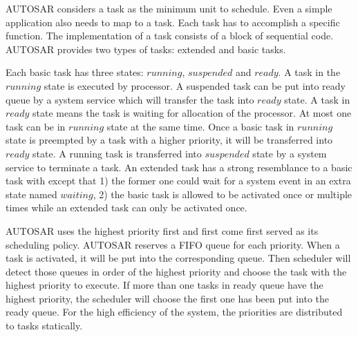 \documentclass[sigconf]{acmart}
\begin{document}
AUTOSAR considers a task as the minimum unit to schedule. Even a simple application also needs to map to a task. Each task has to accomplish a specific function. The implementation of a task consists of a block of sequential code. AUTOSAR provides two types of tasks: extended and basic tasks.

Each basic task has three states: $running$, $suspended$ and $ready$. A task in the $running$ state is executed by processor. A suspended task can be put into ready queue by a system service which will transfer the task into $ready$ state. A task in $ready$ state means the task is waiting for allocation of the processor. At most one task can be in $running$ state at the same time. Once a basic task in $running$ state is preempted by a task with a higher priority, it will be transferred into $ready$ state. A running task is transferred into $suspended$ state by a system service to terminate a task. An extended task has a strong resemblance to a basic task with except that 1) the former one could wait for a system event in an extra state named $waiting$, 2) the basic task is allowed to be activated once or multiple times while an extended task can only be activated once. 

AUTOSAR uses the highest priority first and first come first served as its scheduling policy. AUTOSAR reserves a FIFO queue for each priority. When a task is activated, it will be put into the corresponding queue. Then scheduler will detect those queues in order of the highest priority and choose the task with the highest priority to execute. If more than one tasks in ready queue have the highest priority, the scheduler will choose the first one has been put into the ready queue. For the high efficiency of the system, the priorities are distributed to tasks statically.
\end{document}
